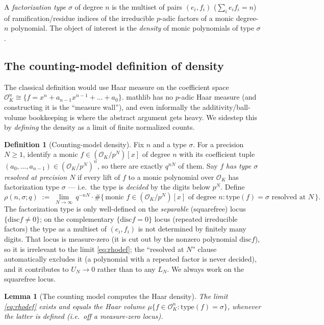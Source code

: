 \documentclass[11pt]{article}
\newtheorem{lemma}[theorem]{Lemma}
\theoremstyle{definition}
\newtheorem{definition}[theorem]{Definition}
\theoremstyle{remark}
\newcommand{\OK}{\mathcal{O}_K}
\newcommand{\type}{\mathrm{type}}
\newcommand{\disc}{\mathrm{disc}}
\newcommand{\rhocount}{\rho}
\begin{document}
A \emph{factorization type} $\sigma$ of degree $n$ is the multiset of pairs
$(e_i,f_i)$ ($\sum_i e_if_i=n$) of ramification/residue indices of the irreducible
$p$-adic factors of a monic degree-$n$ polynomial. The object of interest is the
\emph{density} of monic polynomials of type $\sigma$.

\subsection{The counting-model definition of density}

The classical definition would use Haar measure on the coefficient space
$\OK^n\cong\{f=x^n+a_{n-1}x^{n-1}+\dots+a_0\}$. mathlib has no $p$-adic Haar
measure (and constructing it is the ``measure wall''), and even informally the
additivity/ball-volume bookkeeping is where the abstract argument gets heavy. We
sidestep this by \emph{defining} the density as a limit of finite normalized counts.

\begin{definition}[Counting-model density]\label{def:count}
Fix $n$ and a type $\sigma$. For a precision $N\ge 1$, identify a monic
$f\in(\OK/p^N)[x]$ of degree $n$ with its coefficient tuple
$(a_0,\dots,a_{n-1})\in(\OK/p^N)^n$, so there are exactly $q^{nN}$ of them. Say
$f$ \emph{has type $\sigma$ resolved at precision $N$} if every lift of $f$ to a
monic polynomial over $\OK$ has factorization type $\sigma$ --- i.e.\ the type is
\emph{decided} by the digits below $p^N$. Define
\begin{equation}\label{eq:rhodef}
  \rhocount(n,\sigma;q)\;:=\;\lim_{N\to\infty}\,
  q^{-nN}\cdot\#\bigl\{\,\text{monic }f\in(\OK/p^N)[x]\text{ of degree }n
  : \type(f)=\sigma\text{ resolved at }N\,\bigr\}.
\end{equation}
The factorization type is only well-defined on the \emph{separable} (squarefree)
locus $\{\disc f\ne0\}$; on the complementary $\{\disc f=0\}$ locus (repeated
irreducible factors) the type as a multiset of $(e_i,f_i)$ is not determined by
finitely many digits. That locus is measure-zero (it is cut out by the nonzero
polynomial $\disc f$), so it is irrelevant to the limit \eqref{eq:rhodef}; the
``resolved at $N$'' clause automatically excludes it (a polynomial with a repeated
factor is never decided), and it contributes to $U_N\to0$ rather than to any
$L_N$. We always work on the squarefree locus.
\end{definition}

\begin{lemma}[The counting model computes the Haar density]\label{lem:countHaar}
The limit \eqref{eq:rhodef} exists and equals the Haar volume
$\mu\{f\in\OK^n:\type(f)=\sigma\}$, whenever the latter is defined (i.e.\ off a
measure-zero locus).
\end{lemma}
\end{document}
